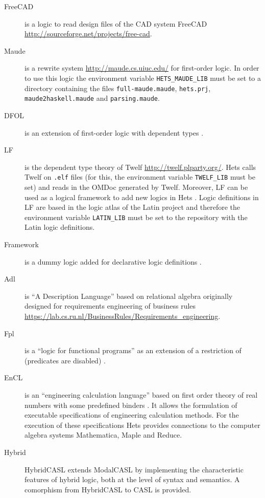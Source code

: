 \documentclass{article}
\begin{document}
\begin{description}
\item[FreeCAD] is a logic to read design files of the CAD system
  FreeCAD\\\url{http://sourceforge.net/projects/free-cad}.

\item[Maude] is a rewrite system \url{http://maude.cs.uiuc.edu/} for
  first-order logic. In order to use this logic the environment variable
  \verb+HETS_MAUDE_LIB+ must be set to a directory containing the files
  \verb+full-maude.maude+, \verb+hets.prj+, \verb+maude2haskell.maude+ and
  \verb+parsing.maude+.

\item[DFOL] is an extension of first-order logic with dependent types \cite{rabe:dfol:06}.

\item [LF] is the dependent type theory of Twelf \url{http://twelf.plparty.org/}. Hets
      calls Twelf on \verb+.elf+ files (for this, the environment variable
      \verb+TWELF_LIB+ must be set) and reads in the OMDoc generated by Twelf.
      Moreover, LF can be used as a logical framework to add new logics in Hets \cite{CHK+2011a}.
      Logic definitions in LF are based in the logic atlas of the Latin project \cite{project:latin}
      and therefore the environment variable \verb+LATIN_LIB+ must be set to the
      repository with the Latin logic definitions.

\item[Framework] is a dummy logic added for declarative logic definitions \cite{CHK+2011a}.

\item[Adl] is ``A Description Language'' based on relational algebra originally
  designed for requirements engineering of business rules
  \url{https://lab.cs.ru.nl/BusinessRules/Requirements_engineering}.

\item[Fpl] is a ``logic for functional programs'' as an extension of a
  restriction of \CASL (predicates are disabled) \cite{Sannella12}.

\item[EnCL] is an ``engineering calculation language'' based on first
  order theory of real numbers with some predefined binders
  \cite{logic:EnCL}.  It allows the formulation of executable
  specifications of engineering calculation methods. For the execution
  of these specifications Hets provides connections to the computer
  algebra systems Mathematica, Maple and Reduce.
\item[Hybrid] HybridCASL \cite{DBLP:conf/calco/NevesMMB13} extends ModalCASL by implementing
the characteristic features of hybrid logic, both at the level of syntax and semantics. A comorphism from HybridCASL
to CASL is provided.


\end{description}
\end{document}

